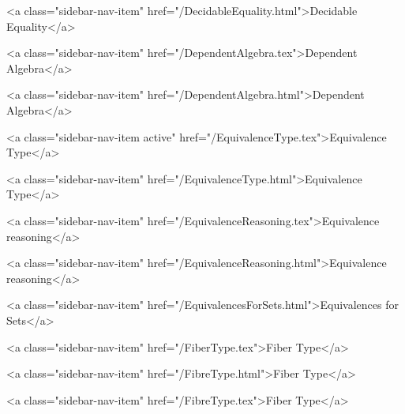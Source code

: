       
        
          <a class="sidebar-nav-item" href="/DecidableEquality.html">Decidable Equality</a>
        
      
    
      
        
          <a class="sidebar-nav-item" href="/DependentAlgebra.tex">Dependent Algebra</a>
        
      
    
      
        
          <a class="sidebar-nav-item" href="/DependentAlgebra.html">Dependent Algebra</a>
        
      
    
      
        
          <a class="sidebar-nav-item active" href="/EquivalenceType.tex">Equivalence Type</a>
        
      
    
      
        
          <a class="sidebar-nav-item" href="/EquivalenceType.html">Equivalence Type</a>
        
      
    
      
        
          <a class="sidebar-nav-item" href="/EquivalenceReasoning.tex">Equivalence reasoning</a>
        
      
    
      
        
          <a class="sidebar-nav-item" href="/EquivalenceReasoning.html">Equivalence reasoning</a>
        
      
    
      
        
          <a class="sidebar-nav-item" href="/EquivalencesForSets.html">Equivalences for Sets</a>
        
      
    
      
        
          <a class="sidebar-nav-item" href="/FiberType.tex">Fiber Type</a>
        
      
    
      
        
          <a class="sidebar-nav-item" href="/FibreType.html">Fiber Type</a>
        
      
    
      
        
          <a class="sidebar-nav-item" href="/FibreType.tex">Fiber Type</a>
        
